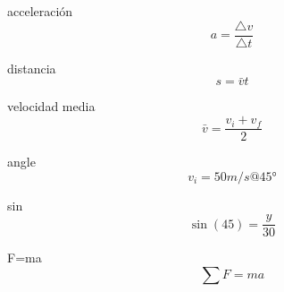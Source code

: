 
acceleración
\[ a=\frac{\triangle{v}}{\triangle{t}} \]

distancia
\[ s=\bar{v}t \]

velocidad media
\[ \bar{v} = \frac{v_i+v_f}{2} \]

angle
\[ v_i=50m/s @ \ang{45} \]

sin
\[ \sin(45)=\frac{y}{30} \]

F=ma
\[ \sum F=ma \]
